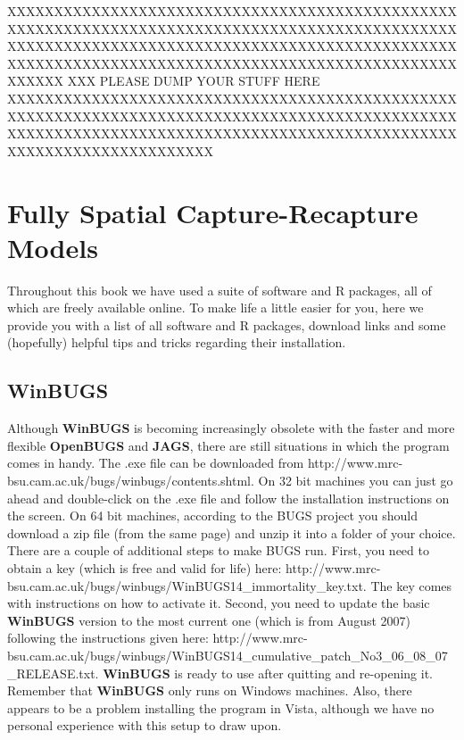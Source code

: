 XXXXXXXXXXXXXXXXXXXXXXXXXXXXXXXXXXXXXXXXXXXXXXXXXXXXXXXXXXXXXXXXXXXXXXXXXXXXXXXXXXXXXXXXXXXXXXXXXXXXXXXXXXXXXXXXXXXXXXXXXXXXXXXXXXXXXXXXXXXXXXXXXXXXXXXXXXXXXXXXXXXXXXXXXXXXXXXXXXXXXXXXXXXXXXXXXXXXXX
XXX PLEASE DUMP YOUR STUFF HERE XXXXXXXXXXXXXXXXXXXXXXXXXXXXXXXXXXXXXXXXXXXXXXXXXXXXXXXXXXXXXXXXXXXXXXXXXXXXXXXXXXXXXXXXXXXXXXXXXXXXXXXXXXXXXXXXXXXXXXXXXXXXXXXXXXXXXXXXXXXXXXXXXXXXXXXXXXXXXXXXXXXXXX

\chapter{Fully Spatial Capture-Recapture Models}
\label{chapt.scr0}

\vspace{.3in}

Throughout this book we have used a suite of software and R packages, all of which are freely available online. To make life a little easier for you, here we provide you with a list of all software and R packages, download links and some (hopefully) helpful tips and tricks regarding their installation.  


\section{WinBUGS}
Although {\bf WinBUGS} \citep{gilks_etal:1994} is becoming increasingly obsolete with the faster and more flexible {\bf OpenBUGS} and {\bf JAGS}, there are still situations in which the program comes in handy.  
The .exe file can be downloaded from http://www.mrc-bsu.cam.ac.uk/bugs/winbugs/contents.shtml. On 32 bit machines you can just go ahead and double-click on the .exe file and follow the installation instructions on the screen.
On 64 bit machines, according to the BUGS project you should download a zip file (from the same page) and unzip it into a folder of your choice.
There are a couple of additional steps to make BUGS run. 
First, you need to obtain a key (which is free and valid for life) here: http://www.mrc-bsu.cam.ac.uk/bugs/winbugs/WinBUGS14_immortality_key.txt. The key comes with instructions on how to activate it.
Second, you need to update the basic {\bf WinBUGS} version to the most current one (which is from August 2007) following the instructions given here: http://www.mrc-bsu.cam.ac.uk/bugs/winbugs/WinBUGS14_cumulative_patch_No3_06_08_07_RELEASE.txt.
{\bf WinBUGS} is ready to use after quitting and re-opening it.
Remember that {\bf WinBUGS} only runs on Windows machines. Also, there appears to be a problem installing the program in Vista, although we have no personal experience with this setup to draw upon.


